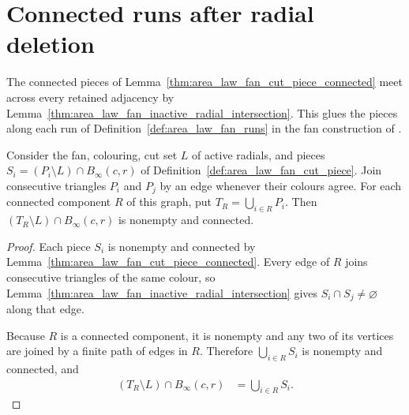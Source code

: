 \section{Connected runs after radial deletion}
\label{sec:area_law_fan_cut_runs}

The connected pieces of
Lemma~\ref{thm:area_law_fan_cut_piece_connected} meet across every
retained adjacency by
Lemma~\ref{thm:area_law_fan_inactive_radial_intersection}.
This glues the pieces along each run of
Definition~\ref{def:area_law_fan_runs} in the fan construction of
\cite[Section~11]{OpenAI2026AreaLaw}.

\begin{lemma}
    \label{thm:area_law_fan_cut_run_connected}
    \leanok
    Consider the fan, colouring, cut set $L$ of active radials, and pieces
    $S_i=(P_i\setminus L)\cap B_\infty(c,r)$ of
    Definition~\ref{def:area_law_fan_cut_piece}.
    Join consecutive triangles $P_i$ and $P_j$ by an edge whenever their
    colours agree. For each connected component $R$ of this graph,
    put $T_R=\bigcup_{i\in R}P_i$. Then
    $(T_R\setminus L)\cap B_\infty(c,r)$ is nonempty and connected.
\end{lemma}
\begin{proof}
    \leanok
    Each piece $S_i$ is nonempty and connected by
    Lemma~\ref{thm:area_law_fan_cut_piece_connected}.
    Every edge of $R$ joins consecutive triangles of the same colour, so
    Lemma~\ref{thm:area_law_fan_inactive_radial_intersection} gives
    $S_i\cap S_j\ne\varnothing$ along that edge.

    Because $R$ is a connected component, it is nonempty and any two of
    its vertices are joined by a finite path of edges in $R$.
    Therefore $\bigcup_{i\in R}S_i$ is nonempty and connected, and
    \begin{align}
        (T_R\setminus L)\cap B_\infty(c,r)
         & =\bigcup_{i\in R}S_i.
    \end{align}
\end{proof}
